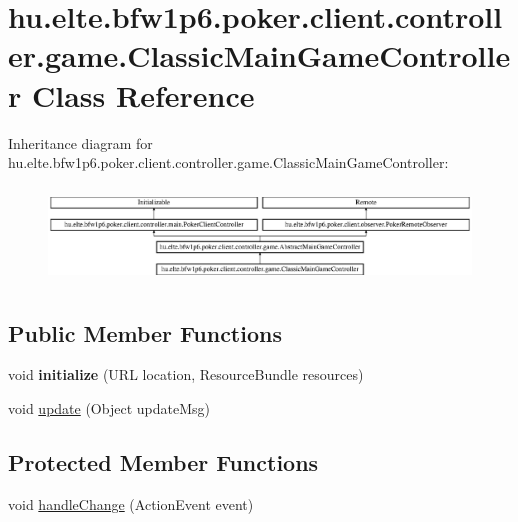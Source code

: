 \hypertarget{classhu_1_1elte_1_1bfw1p6_1_1poker_1_1client_1_1controller_1_1game_1_1_classic_main_game_controller}{}\section{hu.\+elte.\+bfw1p6.\+poker.\+client.\+controller.\+game.\+Classic\+Main\+Game\+Controller Class Reference}
\label{classhu_1_1elte_1_1bfw1p6_1_1poker_1_1client_1_1controller_1_1game_1_1_classic_main_game_controller}
Inheritance diagram for hu.\+elte.\+bfw1p6.\+poker.\+client.\+controller.\+game.\+Classic\+Main\+Game\+Controller\+:\begin{figure}[H]
\begin{center}
\leavevmode
\includegraphics[height=2.592592cm]{classhu_1_1elte_1_1bfw1p6_1_1poker_1_1client_1_1controller_1_1game_1_1_classic_main_game_controller}
\end{center}
\end{figure}
\subsection*{Public Member Functions}
\begin{DoxyCompactItemize}
\item 
\hypertarget{classhu_1_1elte_1_1bfw1p6_1_1poker_1_1client_1_1controller_1_1game_1_1_classic_main_game_controller_a1bcb0b61f907d267d87455a50940afb2}{}void {\bfseries initialize} (U\+R\+L location, Resource\+Bundle resources)\label{classhu_1_1elte_1_1bfw1p6_1_1poker_1_1client_1_1controller_1_1game_1_1_classic_main_game_controller_a1bcb0b61f907d267d87455a50940afb2}

\item 
void \hyperlink{classhu_1_1elte_1_1bfw1p6_1_1poker_1_1client_1_1controller_1_1game_1_1_classic_main_game_controller_a2eb9dbadf88f423579f5b5e1e7716f04}{update} (Object update\+Msg)
\end{DoxyCompactItemize}
\subsection*{Protected Member Functions}
\begin{DoxyCompactItemize}
\item 
void \hyperlink{classhu_1_1elte_1_1bfw1p6_1_1poker_1_1client_1_1controller_1_1game_1_1_classic_main_game_controller_a7667c2c8a5af742a9212c00fc27222c3}{handle\+Change} (Action\+Event event)
\end{DoxyCompactItemize}
